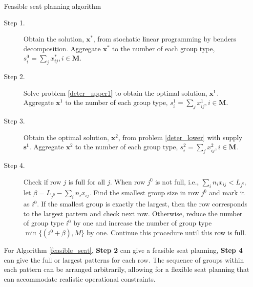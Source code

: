 \begin{algorithm}[H]
  \caption{Feasible seat planning algorithm}\label{feasible_seat}
    \begin{description}
    \item[Step 1.] Obtain the solution, $\mathbf{x}^{*}$, from stochatic linear programming by benders decomposition. Aggregate $\mathbf{x}^{*}$ to the number of each group type, ${s}_{i}^{0} =\sum_{j} x^{*}_{ij}, i \in \mathbf{M}$.

    \item[Step 2.] Solve problem \eqref{deter_upper1} to obtain the optimal solution, $\mathbf{x}^{1}$. Aggregate $\mathbf{x}^{1}$ to the number of each group type, ${s}_{i}^{1} = \sum_{j} x^{1}_{ij}, i \in \mathbf{M}$.
    
    \item[Step 3.] Obtain the optimal solution, $\mathbf{x}^{2}$, from problem \eqref{deter_lower} with supply $\mathbf{s}^{1}$. Aggregate $\mathbf{x}^{2}$ to the number of each group type, ${s}_{i}^{2} = \sum_{j} x^{2}_{ij}, i \in \mathbf{M}$.

    \item[Step 4.] Check if row $j$ is full for all $j$. When row $j^{0}$ is not full, i.e., $\sum_{i} n_{i} x_{ij} < L_{j^{0}}$, let $\beta = L_{j^{0}} - \sum_{i} n_{i} x_{ij}$. 
    Find the smallest group size in row $j^{0}$ and mark it as $i^0$. If the smallest group is exactly the largest, then the row corresponds to the largest pattern and check next row. Otherwise, reduce the number of group type $i^0$ by one and increase the number of group type $\min \{(i^0+\beta), M\}$ by one. Continue this procedure until this row is full.
   \end{description}
  \end{algorithm}

For Algorithm \ref{feasible_seat}, {\bf Step 2} can give a feasible seat planning, {\bf Step 4} can give the full or largest patterns for each row. The sequence of groups within each pattern can be arranged arbitrarily, allowing for a flexible seat planning that can accommodate realistic operational constraints. 






